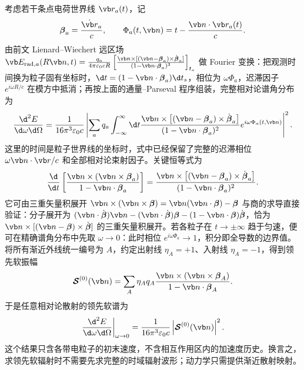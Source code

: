 考虑若干条点电荷世界线 $\vb r_a(t)$，记
\begin{equation*}
	\boldsymbol\beta_a=\frac{\dot{\vb r}_a}{c},
	\qquad
	\Phi_a(t,\vb n)=t-\frac{\vb n\cdot\vb r_a(t)}{c}.
\end{equation*}
由前文 Lienard--Wiechert 远区场 $\vb E_{\mathrm{rad},a}(R\vb n,t)=\frac{q_a}{4\pi\varepsilon_0cR}\left[\frac{\vb n\times[(\vb n-\boldsymbol\beta_a)\times\dot{\boldsymbol\beta}_a]}{(1-\vb n\cdot\boldsymbol\beta_a)^3}\right]_{t_s}$ 做 Fourier 变换：把观测时间换为粒子固有坐标时，$\d t=(1-\vb n\cdot\boldsymbol\beta_a)\d t_s$，相位为 $\omega\Phi_a$，迟滞因子 $e^{i\omega R/c}$ 在模方中抵消；再按上面的通量--Parseval 程序组装，完整相对论谱角分布为
\begin{equation*}
	\frac{\d^2E}{\d\omega\d\Omega}
	=\frac{1}{16\pi^3\varepsilon_0c}
	\left|
	\sum_a q_a\int_{-\infty}^{\infty}\d t
	\frac{\vb n\times\left[(\vb n-\boldsymbol\beta_a)\times\dot{\boldsymbol\beta}_a\right]}
	{(1-\vb n\cdot\boldsymbol\beta_a)^2}
	e^{i\omega\Phi_a(t,\vb n)}
	\right|^2.
\end{equation*}
这里的时间是粒子世界线的坐标时，式中已经保留了完整的迟滞相位 $\omega\vb n\cdot\vb r/c$ 和全部相对论束射因子。关键恒等式为
\begin{equation*}
	\frac{\d}{\d t}
	\left[
	\frac{\vb n\times(\vb n\times\boldsymbol\beta_a)}
	{1-\vb n\cdot\boldsymbol\beta_a}
	\right]
	=
	\frac{\vb n\times\left[(\vb n-\boldsymbol\beta_a)\times\dot{\boldsymbol\beta}_a\right]}
	{(1-\vb n\cdot\boldsymbol\beta_a)^2}.
\end{equation*}
它可由三重矢量积展开 $\vb n\times(\vb n\times\boldsymbol\beta)=\vb n(\vb n\cdot\boldsymbol\beta)-\boldsymbol\beta$ 与商的求导直接验证：分子展开为 $(\vb n\cdot\dot{\boldsymbol\beta})\vb n-(\vb n\cdot\dot{\boldsymbol\beta})\boldsymbol\beta-(1-\vb n\cdot\boldsymbol\beta)\dot{\boldsymbol\beta}$，恰为 $\vb n\times[(\vb n-\boldsymbol\beta)\times\dot{\boldsymbol\beta}]$ 的三重矢量积展开。若各粒子在 $t\to\pm\infty$ 趋于匀速，便可在精确谱角分布中先取 $\omega\to0$：此时相位 $e^{i\omega\Phi_a}\to1$，积分即全导数的边界值。将所有渐近外线统一编号为 $A$，约定出射线 $\eta_A=+1$、入射线 $\eta_A=-1$，得到领先软振幅
\begin{equation*}
	\boldsymbol{\mathcal S}^{(0)}(\vb n)
	=\sum_A\eta_Aq_A
	\frac{\vb n\times(\vb n\times\boldsymbol\beta_A)}
	{1-\vb n\cdot\boldsymbol\beta_A}.
\end{equation*}
于是任意相对论散射的领先软谱为
\begin{equation*}
	\left.\frac{\d^2E}{\d\omega\d\Omega}\right|_{\omega\to0}
	=\frac{1}{16\pi^3\varepsilon_0c}
	\left|\boldsymbol{\mathcal S}^{(0)}(\vb n)\right|^2.
\end{equation*}
这个结果只含各带电粒子的初末速度，不含相互作用区内的加速度历史。换言之，求领先软辐射时不需要先求完整的时域辐射波形；动力学只需提供渐近散射映射。

